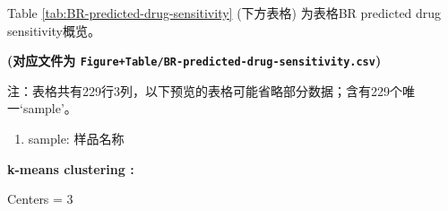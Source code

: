 \documentclass[
]{article}
\providecommand{\tightlist}{%
  \setlength{\itemsep}{0pt}\setlength{\parskip}{0pt}}
\begin{document}
\begin{center}\vspace{1.5cm}\end{center}

\begin{center}\vspace{1.5cm}\end{center}

Table \ref{tab:BR-predicted-drug-sensitivity} (下方表格) 为表格BR predicted drug sensitivity概览。

\textbf{(对应文件为 \texttt{Figure+Table/BR-predicted-drug-sensitivity.csv})}

\begin{center}\begin{tcolorbox}[colback=gray!10, colframe=gray!50, width=0.9\linewidth, arc=1mm, boxrule=0.5pt]注：表格共有229行3列，以下预览的表格可能省略部分数据；含有229个唯一`sample'。
\end{tcolorbox}
\end{center}
\begin{center}\begin{tcolorbox}[colback=gray!10, colframe=gray!50, width=0.9\linewidth, arc=1mm, boxrule=0.5pt]\begin{enumerate}\tightlist
\item sample:  样品名称
\end{enumerate}\end{tcolorbox}
\end{center}\begin{center}\begin{tcolorbox}[colback=gray!10, colframe=gray!50, width=0.9\linewidth, arc=1mm, boxrule=0.5pt]
\textbf{
k-means clustering
:}

\vspace{0.5em}

    Centers = 3

\vspace{2em}
\end{tcolorbox}
\end{center}
\end{document}
